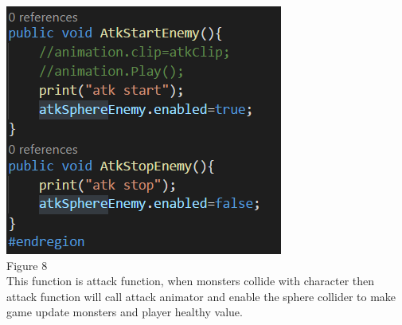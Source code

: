\begin{itemize}
\includegraphics[scale=0.5]{img/MonsterAtk.png}\\{Figure 8}\\
This function is attack function, when monsters collide with character then attack function will call attack animator and enable the sphere collider to make game update monsters and player healthy value.
\end{itemize}

